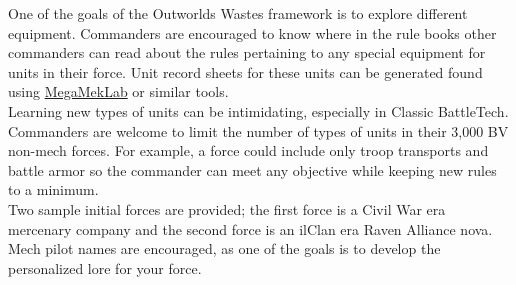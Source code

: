 \documentclass[UTF8]{article}
\begin{document}
One of the goals of the Outworlds Wastes framework is to explore different equipment.
Commanders are encouraged to know where in the rule books other commanders can read about the rules pertaining to any special equipment for units in their force.
Unit record sheets for these units can be generated found using \href{https://megamek.org}{MegaMekLab} or similar tools.\\

Learning new types of units can be intimidating, especially in Classic BattleTech.
Commanders are welcome to limit the number of types of units in their 3,000 BV non-mech forces.
For example, a force could include only troop transports and battle armor so the commander can meet any objective while keeping new rules to a minimum.\\

Two sample initial forces are provided; the first force is a Civil War era mercenary company and the second force is an ilClan era Raven Alliance nova.
Mech pilot names are encouraged, as one of the goals is to develop the personalized lore for your force.\\

\newpage
\end{document}
